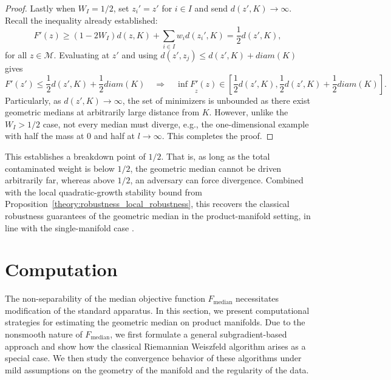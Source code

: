 \documentclass[10pt]{article}
\newcommand{\calM}{\mathcal{M}}
\begin{document}
\begin{proof}
Lastly when $W_I = 1/2$, set $z_i' = z'$ for $i\in I$ and send $d(z',K)\to \infty$. Recall the inequality already established:
\begin{equation*}
	F'(z) \ge (1-2W_I) d(z,K) + \sum_{i\in I} w_i d(z_i', K) = \frac{1}{2} d(z',K),
\end{equation*}
for all $z \in \calM$. Evaluating at $z'$ and using $d(z', z_j) \le d(z', K) + diam(K)$ gives 
\begin{equation*}
	F'(z') \le \frac{1}{2} d(z',K) + \frac{1}{2}diam(K)\quad \Longrightarrow \quad \underset{z}{\inf F'(z)} \in 
	\left[
	\frac{1}{2}d(z',K), \frac{1}{2}d(z',K) + \frac{1}{2}diam(K)
	\right].
\end{equation*}
Particularly, as $d(z',K)\to \infty$, the set of minimizers is unbounded as there exist geometric medians at arbitrarily large distance from $K$. However, unlike the $W_I > 1/2$ case, not every median must diverge, e.g., the one-dimensional example with half the mass at 0 and half at $l\to \infty$. This completes the proof.
\end{proof}


This establishes a breakdown point of $1/2$. That is, as long as the total contaminated weight is below $1/2$, the geometric median cannot be driven arbitrarily far, whereas above $1/2$, an adversary can force divergence. Combined with the local quadratic-growth stability bound from Proposition~\ref{theory:robustness_local_robustness}, this recovers the classical robustness guarantees of the geometric median in the product-manifold setting, in line with the single-manifold case \citep{fletcher_2009_GeometricMedianRiemannian}.


\section{Computation}\label{sec:computation}


The non-separability of the median objective function $F_{\text{median}}$ necessitates modification of the standard apparatus. In this section, we present computational strategies for estimating the geometric median on product manifolds. Due to the nonsmooth nature of $F_{\text{median}}$, we first formulate a general subgradient-based approach and show how the classical Riemannian Weiszfeld algorithm arises as a special case. We then study the convergence behavior of these algorithms under mild assumptions on the geometry of the manifold and the regularity of the data. 
\end{document}
